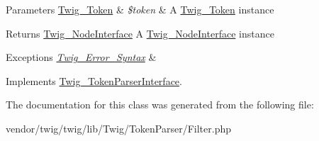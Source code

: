 \begin{DoxyParams}[1]{Parameters}
\hyperlink{classTwig__Token}{Twig\+\_\+\+Token} & {\em \$token} & A \hyperlink{classTwig__Token}{Twig\+\_\+\+Token} instance\\
\hline
\end{DoxyParams}
\begin{DoxyReturn}{Returns}
\hyperlink{interfaceTwig__NodeInterface}{Twig\+\_\+\+Node\+Interface} A \hyperlink{interfaceTwig__NodeInterface}{Twig\+\_\+\+Node\+Interface} instance
\end{DoxyReturn}

\begin{DoxyExceptions}{Exceptions}
{\em \hyperlink{classTwig__Error__Syntax}{Twig\+\_\+\+Error\+\_\+\+Syntax}} & \\
\hline
\end{DoxyExceptions}


Implements \hyperlink{interfaceTwig__TokenParserInterface_a9d003ebcca4a13c6f36b86e79815e823}{Twig\+\_\+\+Token\+Parser\+Interface}.



The documentation for this class was generated from the following file\+:\begin{DoxyCompactItemize}
\item 
vendor/twig/twig/lib/\+Twig/\+Token\+Parser/Filter.\+php\end{DoxyCompactItemize}
